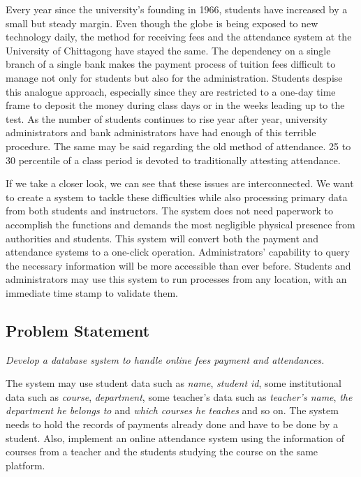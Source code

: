 Every year since the university’s founding in 1966, students have increased by a small but steady margin. Even though the globe is being exposed to new technology daily, the method for receiving fees and the attendance system at the University of Chittagong have stayed the same. The dependency on a single branch of a single bank makes the payment process of tuition fees difficult to manage not only for students but also for the administration. Students despise this analogue approach, especially since they are restricted to a one-day time frame to deposit the money during class days or in the weeks leading up to the test. As the number of students continues to rise year after year, university administrators and bank administrators have had enough of this terrible procedure. The same may be said regarding the old method of attendance. 25 to 30 percentile of a class period is devoted to traditionally attesting attendance.


If we take a closer look, we can see that these issues are interconnected. We want to create a system to tackle these difficulties while also processing primary data from both students and instructors. The system does not need paperwork to accomplish the functions and demands the most negligible physical presence from authorities and students. This system will convert both the payment and attendance systems to a one-click operation. Administrators' capability to query the necessary information will be more accessible than ever before. Students and administrators may use this system to run processes from any location, with an immediate time stamp to validate them.

\subsection{Problem Statement}\label{subsec:ps} 

\emph{Develop a database system to handle online fees payment and attendances.}

The system may use student data such as \emph{name}, \emph{student id}, some institutional data such as \emph{course}, \emph{department}, some teacher's data such as \emph{teacher's name}, \emph{the department he belongs to} and \emph{which courses he teaches} and so on. The system needs to hold the records of payments already done and have to be done by a student. Also, implement an online attendance system using the information of courses from a teacher and the students studying the course on the same platform.

